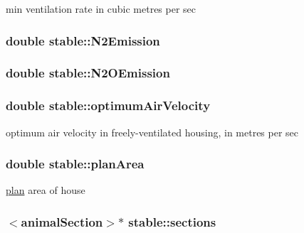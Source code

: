 min ventilation rate in cubic metres per sec \hypertarget{classstable_a92a798364c13ada51dea903e382a4324}{
\subsubsection[{N2Emission}]{\setlength{\rightskip}{0pt plus 5cm}double {\bf stable::N2Emission}}}
\label{classstable_a92a798364c13ada51dea903e382a4324}
\hypertarget{classstable_ac2affdc6d7ce852d12562a3725cd56bb}{
\subsubsection[{N2OEmission}]{\setlength{\rightskip}{0pt plus 5cm}double {\bf stable::N2OEmission}}}
\label{classstable_ac2affdc6d7ce852d12562a3725cd56bb}
\hypertarget{classstable_a8b86c3ce1b5b2b45d21944e13e417f0d}{
\subsubsection[{optimumAirVelocity}]{\setlength{\rightskip}{0pt plus 5cm}double {\bf stable::optimumAirVelocity}}}
\label{classstable_a8b86c3ce1b5b2b45d21944e13e417f0d}


optimum air velocity in freely-\/ventilated housing, in metres per sec \hypertarget{classstable_afa55899e2704ab5fb1c444eff74be611}{
\subsubsection[{planArea}]{\setlength{\rightskip}{0pt plus 5cm}double {\bf stable::planArea}}}
\label{classstable_afa55899e2704ab5fb1c444eff74be611}


\hyperlink{classplan}{plan} area of house \hypertarget{classstable_acb077d73e0190efa9c1359d03515d991}{
\subsubsection[{sections}]{$<${\bf animalSection}$>$$\ast$ {\bf stable::sections}}}
\label{classstable_acb077d73e0190efa9c1359d03515d991}


